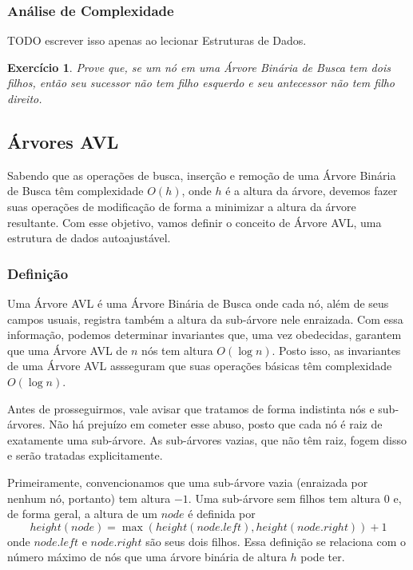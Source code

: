 \documentclass[11pt]{article}
\newtheorem{exercicio}{Exercício}
\begin{document}
\subsubsection{Análise de Complexidade}
\label{sec:org3e62ace}

TODO escrever isso apenas ao lecionar Estruturas de Dados.

\begin{exercicio}
Prove que, se um nó em uma Árvore Binária de Busca tem dois
filhos, então seu sucessor não tem filho esquerdo e seu antecessor
não tem filho direito.
\end{exercicio}

\subsection{Árvores AVL}
\label{sec:orgd5f0094}
\label{org6ea5e87}

Sabendo que as operações de busca, inserção e remoção de uma Árvore
Binária de Busca têm complexidade \(O(h)\), onde \(h\) é a altura da
árvore, devemos fazer suas operações de modificação de forma a
minimizar a altura da árvore resultante.  Com esse objetivo, vamos
definir o conceito de Árvore AVL, uma estrutura de dados
autoajustável.

\subsubsection{Definição}
\label{sec:orgce1ee50}

Uma Árvore AVL é uma Árvore Binária de Busca onde cada nó, além de
seus campos usuais, registra também a altura da sub-árvore nele
enraizada.  Com essa informação, podemos determinar invariantes
que, uma vez obedecidas, garantem que uma Árvore AVL de \(n\) nós tem
altura \(O(\log n)\).  Posto isso, as invariantes de uma Árvore AVL
assseguram que suas operações básicas têm complexidade \(O(\log n)\).

Antes de prosseguirmos, vale avisar que tratamos de forma
indistinta nós e sub-árvores.  Não há prejuízo em cometer esse
abuso, posto que cada nó é raiz de exatamente uma sub-árvore.  As
sub-árvores vazias, que não têm raiz, fogem disso e serão tratadas
explicitamente.

Primeiramente, convencionamos que uma sub-árvore vazia (enraizada
por nenhum nó, portanto) tem altura \(-1\).  Uma sub-árvore sem
filhos tem altura \(0\) e, de forma geral, a altura de um \(node\) é
definida por
$$
   height(node) = \max(height(node.left), height(node.right)) + 1
   $$
onde \(node.left\) e \(node.right\) são seus dois filhos.  Essa
definição se relaciona com o número máximo de nós que uma árvore
binária de altura \(h\) pode ter.
\end{document}
